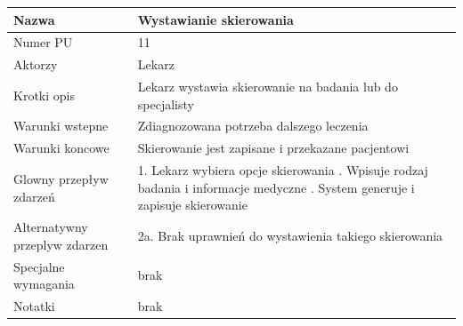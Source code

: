 \documentclass{article}
\begin{document}
\vspace{1cm}

\noindent
\begin{tabular}{|m{10em}|m{30em}|}
        \hline
        Nazwa & Wystawianie skierowania \\
        \hline
        Numer PU & 11\\
        \hline
        Aktorzy & Lekarz\\
        \hline
        Krotki opis & Lekarz wystawia skierowanie na badania lub do specjalisty\\
        \hline
        Warunki wstepne & Zdiagnozowana potrzeba dalszego leczenia\\
        \hline
        Warunki koncowe & Skierowanie jest zapisane i przekazane pacjentowi\\
        \hline
        Glowny przepływ zdarzeń & 1. Lekarz wybiera opcje skierowania \newline
                                 2. Wpisuje rodzaj badania i informacje medyczne \newline
                                 3. System generuje i zapisuje skierowanie  \\
        \hline
        Alternatywny przeplyw zdarzen &  2a. Brak uprawnień do wystawienia takiego skierowania\\
        \hline
        Specjalne wymagania & brak\\
        \hline
        Notatki& brak\\
        \hline
\end{tabular}
\
\end{document}
